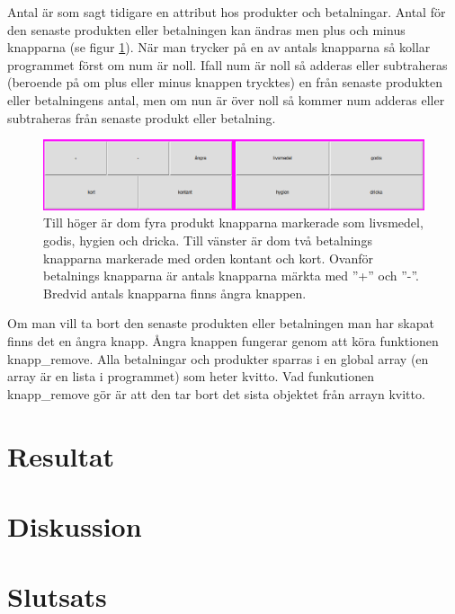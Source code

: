 \documentclass[a4paper, 12pt]{article}
\begin{document}
Antal är som sagt tidigare en attribut hos produkter och betalningar. Antal för den senaste produkten eller betalningen kan ändras men plus och minus knapparna (se figur \ref{fig:3alt}).
När man trycker på en av antals knapparna så kollar programmet först om num är noll. Ifall num är noll så adderas eller subtraheras (beroende på om plus eller minus knappen trycktes) en från senaste produkten eller betalningens antal, men om nun är över noll så kommer num adderas eller subtraheras från senaste produkt eller betalning. 


\begin{figure}[h!]
  \includegraphics[width=\linewidth]{img/3alt.png}
  \caption{
	  Till höger är dom fyra produkt knapparna markerade som livsmedel, godis, hygien och dricka.
	  Till vänster är dom två betalnings knapparna markerade med orden kontant och kort.
	  Ovanför betalnings knapparna är antals knapparna märkta med ''+'' och ''-''.
	  Bredvid antals knapparna finns ångra knappen. 
	}
  \label{fig:3alt}
\end{figure}


Om man vill ta bort den senaste produkten eller betalningen man har skapat finns det en ångra knapp.
Ångra knappen fungerar genom att köra funktionen knapp\_remove. 
Alla betalningar och produkter sparras i en global array (en array är en lista i programmet) som heter kvitto. Vad funkutionen knapp\_remove gör är att den tar bort det sista objektet från arrayn kvitto.





\section{Resultat}

\section{Diskussion}

\section{Slutsats}

\newpage 

%

\printbibliography
\end{document}
